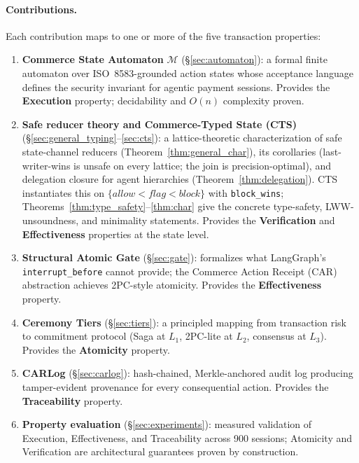 \documentclass{article}
\begin{document}
\paragraph{Contributions.} Each contribution maps to one or more of the five transaction properties:

\begin{enumerate}
\item \textbf{Commerce State Automaton} $\mathcal{M}$ (\S\ref{sec:automaton}): a formal finite automaton over ISO~8583-grounded action states whose acceptance language defines the security invariant for agentic payment sessions. Provides the \textbf{Execution} property; decidability and $O(n)$ complexity proven.

\item \textbf{Safe reducer theory and Commerce-Typed State (CTS)} (\S\ref{sec:general_typing}--\ref{sec:cts}): a lattice-theoretic characterization of safe state-channel reducers (Theorem~\ref{thm:general_char}), its corollaries (last-writer-wins is unsafe on every lattice; the join is precision-optimal), and delegation closure for agent hierarchies (Theorem~\ref{thm:delegation}). CTS instantiates this on $\{\textit{allow}<\textit{flag}<\textit{block}\}$ with \texttt{block\_wins}; Theorems~\ref{thm:type_safety}--\ref{thm:char} give the concrete type-safety, LWW-unsoundness, and minimality statements. Provides the \textbf{Verification} and \textbf{Effectiveness} properties at the state level.

\item \textbf{Structural Atomic Gate} (\S\ref{sec:gate}): formalizes what LangGraph's \texttt{interrupt\_before} cannot provide; the Commerce Action Receipt (CAR) abstraction achieves 2PC-style atomicity. Provides the \textbf{Effectiveness} property.

\item \textbf{Ceremony Tiers} (\S\ref{sec:tiers}): a principled mapping from transaction risk to commitment protocol (Saga at $L_1$, 2PC-lite at $L_2$, consensus at $L_3$). Provides the \textbf{Atomicity} property.

\item \textbf{CARLog} (\S\ref{sec:carlog}): hash-chained, Merkle-anchored audit log producing tamper-evident provenance for every consequential action. Provides the \textbf{Traceability} property.

\item \textbf{Property evaluation} (\S\ref{sec:experiments}): measured validation of Execution, Effectiveness, and Traceability across 900 sessions; Atomicity and Verification are architectural guarantees proven by construction.
\end{enumerate}
\end{document}
